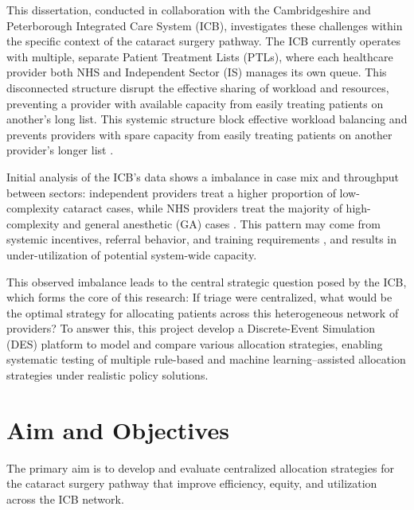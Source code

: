 \documentclass[ %
                    author={Nattanan Nawakitbamrung},
                supervisor={Dr. Sébastien Rochat},
                    degree={MSc},
                     title={Developing and Evaluating the Impact of a Single Patient Treatment List (PTL) for an NHS Integrated Care System},
                  subtitle={},
                      type={},
                      year={2025}]{dissertation}
\begin{document}
\vspace{0.2cm}
This dissertation, conducted in collaboration with the Cambridgeshire and Peterborough Integrated Care System (ICB), investigates these challenges within the specific context of the cataract surgery pathway. The ICB currently operates with multiple, separate Patient Treatment Lists (PTLs), where each healthcare provider both NHS and Independent Sector (IS) manages its own queue. This disconnected structure disrupt the effective sharing of workload and resources, preventing a provider with available capacity from easily treating patients on another's long list. This systemic structure block effective workload balancing and prevents providers with spare capacity from easily treating patients on another provider’s longer list \cite{healthwatch2025strain, ihpn2025stats}.

\vspace{0.2cm}
Initial analysis of the ICB's data shows a imbalance in case mix and throughput between sectors: independent providers treat a higher proportion of low-complexity cataract cases, while NHS providers treat the majority of high-complexity and general anesthetic (GA) cases \cite{nhs2022elective, rcophth2021audit}. This pattern may come from systemic incentives, referral behavior, and training requirements \cite{elalouf2013fair, rawls1971theory}, and results in under-utilization of potential system-wide capacity.

\vspace{0.2cm}
This observed imbalance leads to the central strategic question posed by the ICB, which forms the core of this research: If triage were centralized, what would be the optimal strategy for allocating patients across this heterogeneous network of providers? To answer this, this project develop a Discrete-Event Simulation (DES) platform to model and compare various allocation strategies, enabling systematic testing of multiple rule-based and machine learning–assisted allocation strategies under realistic policy solutions. 

\section{Aim and Objectives}
The primary aim is to develop and evaluate centralized allocation strategies for the cataract surgery pathway that improve efficiency, equity, and utilization across the ICB network.
\end{document}
